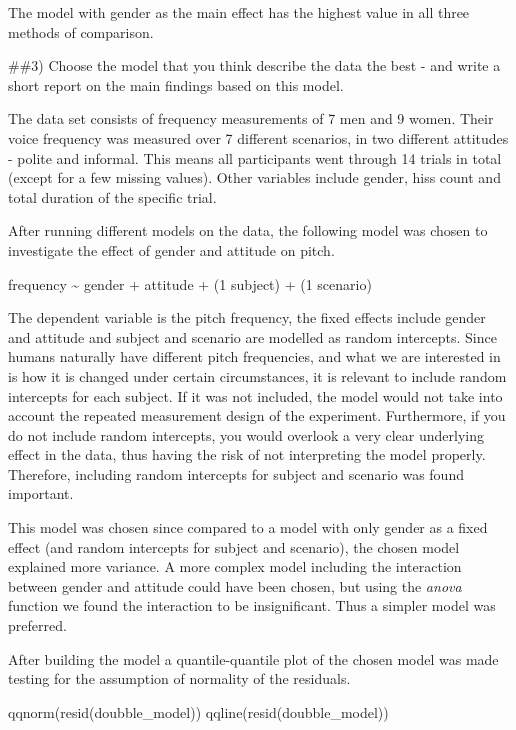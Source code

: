\documentclass[
]{article}
\newenvironment{Shaded}{\begin{snugshade}}{\end{snugshade}}
\newcommand{\FunctionTok}[1]{\textcolor[rgb]{0.00,0.00,0.00}{#1}}
\newcommand{\NormalTok}[1]{#1}
\begin{document}
The model with gender as the main effect has the highest value in all
three methods of comparison.

\#\#3) Choose the model that you think describe the data the best - and
write a short report on the main findings based on this model.

The data set consists of frequency measurements of 7 men and 9 women.
Their voice frequency was measured over 7 different scenarios, in two
different attitudes - polite and informal. This means all participants
went through 14 trials in total (except for a few missing values). Other
variables include gender, hiss count and total duration of the specific
trial.

After running different models on the data, the following model was
chosen to investigate the effect of gender and attitude on pitch.

frequency \textasciitilde{} gender + attitude + (1 \textbar{} subject) +
(1 \textbar{} scenario)

The dependent variable is the pitch frequency, the fixed effects include
gender and attitude and subject and scenario are modelled as random
intercepts. Since humans naturally have different pitch frequencies, and
what we are interested in is how it is changed under certain
circumstances, it is relevant to include random intercepts for each
subject. If it was not included, the model would not take into account
the repeated measurement design of the experiment. Furthermore, if you
do not include random intercepts, you would overlook a very clear
underlying effect in the data, thus having the risk of not interpreting
the model properly. Therefore, including random intercepts for subject
and scenario was found important.

This model was chosen since compared to a model with only gender as a
fixed effect (and random intercepts for subject and scenario), the
chosen model explained more variance. A more complex model including the
interaction between gender and attitude could have been chosen, but
using the \emph{anova} function we found the interaction to be
insignificant. Thus a simpler model was preferred.

After building the model a quantile-quantile plot of the chosen model
was made testing for the assumption of normality of the residuals.

\begin{Shaded}
\begin{Highlighting}[]
\FunctionTok{qqnorm}\NormalTok{(}\FunctionTok{resid}\NormalTok{(doubble\_model))}
\FunctionTok{qqline}\NormalTok{(}\FunctionTok{resid}\NormalTok{(doubble\_model))}
\end{Highlighting}
\end{Shaded}
\end{document}
